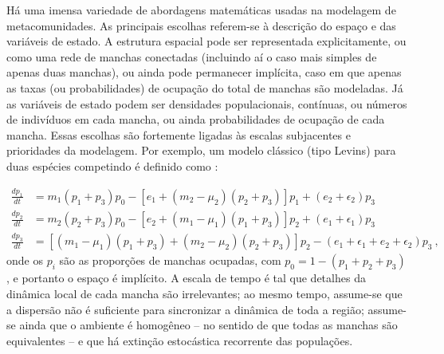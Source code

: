 \documentclass[12pt]{extarticle}
\begin{document}
Há uma imensa variedade de abordagens matemáticas usadas na modelagem de
metacomunidades. As principais escolhas referem-se à descrição do espaço e das
variáveis de estado. A estrutura espacial pode ser representada
explicitamente, ou como uma rede de manchas conectadas (incluindo aí o caso
mais simples de apenas duas manchas), ou ainda pode permanecer implícita, caso
em que apenas as taxas (ou probabilidades) de ocupação do total de manchas são
modeladas. Já as variáveis de estado podem ser densidades populacionais,
contínuas, ou números de indivíduos em cada mancha, ou ainda probabilidades
de ocupação de cada mancha.
Essas escolhas são fortemente ligadas às
escalas subjacentes e prioridades da modelagem. Por exemplo, um
modelo clássico (tipo Levins) para duas espécies competindo é definido como
\citep{slatkin1974}:

\begin{equation}
  \begin{aligned}
    \frac{dp_1}{dt} &= m_1 (p_1+p_3) p_0 - \left[ e_1 + (m_2-\mu_2)(p_2+p_3) \right] p_1 + (e_2+\epsilon_2)p_3\\
    \frac{dp_2}{dt} &= m_2 (p_2+p_3) p_0 - \left[ e_2 + (m_1-\mu_1)(p_1+p_3) \right] p_2 + (e_1+\epsilon_1)p_3\\
    \frac{dp_3}{dt} &= \left[ (m_1-\mu_1)(p_1+p_3) + (m_2-\mu_2)(p_2+p_3)\right] p_2 -
    (e_1+\epsilon_1+e_2+\epsilon_2)p_3~,
  \end{aligned}
\end{equation}
% 
onde os $p_i$ são as proporções de manchas ocupadas, com $p_0 =
1-(p_1+p_2+p_3)$, e portanto o espaço é implícito. A escala de tempo é tal que detalhes da dinâmica local de cada mancha
são irrelevantes; ao mesmo tempo, assume-se que a dispersão não é suficiente para
sincronizar a dinâmica de toda a região; assume-se ainda que o ambiente é
homogêneo -- no sentido de que todas as manchas são equivalentes -- e que há
extinção estocástica recorrente das populações.
\end{document}
